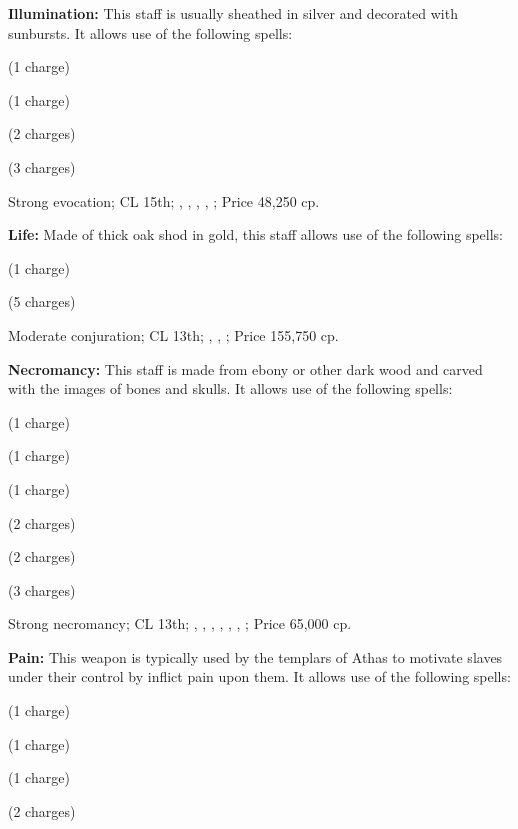 \textbf{Illumination:} This staff is usually sheathed in silver and decorated with sunbursts. It allows use of the following spells:
\begin{itemize*}
\item {} (1 charge)
\item {} (1 charge)
\item {} (2 charges)
\item {} (3 charges)
\end{itemize*}

Strong evocation; CL 15th; , , , , ; Price 48,250 cp.

\textbf{Life:} Made of thick oak shod in gold, this staff allows use of the following spells:
\begin{itemize*}
\item {} (1 charge)
\item {} (5 charges)
\end{itemize*}

Moderate conjuration; CL 13th; , , ; Price 155,750 cp.

\textbf{Necromancy:} This staff is made from ebony or other dark wood and carved with the images of bones and skulls. It allows use of the following spells:
\begin{itemize*}
\item {} (1 charge)
\item {} (1 charge)
\item {} (1 charge)
\item {} (2 charges)
\item {} (2 charges)
\item {} (3 charges)
\end{itemize*}

Strong necromancy; CL 13th; , , , , , , ; Price 65,000 cp.

\textbf{Pain:} This weapon is typically used by the templars of Athas to motivate slaves under their control by inflict pain upon them. It allows use of the following spells:
\begin{itemize*}
\item {} (1 charge)
\item {} (1 charge)
\item {} (1 charge)
\item {} (2 charges)
\end{itemize*}

